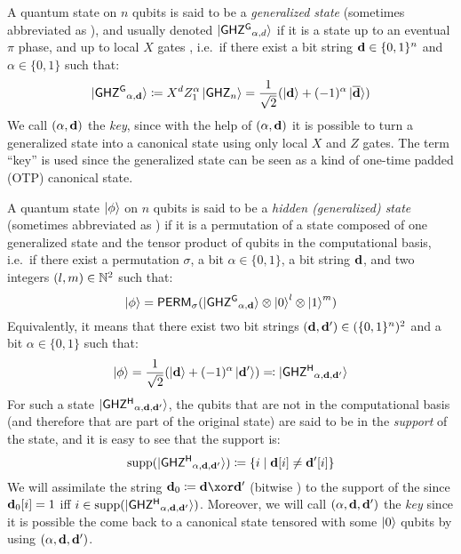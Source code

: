 {  \begin{definition}
    A quantum state on $n$ qubits is said to be a \emph{generalized \GHZ{} state} (sometimes abbreviated as \GGHZ{}), and usually denoted $\ket{ {\sf GHZ^G} {}_{\alpha,d}}$ if it is a \GHZ{} state up to an eventual $\pi$ phase, and up to local $X$ gates , i.e.\ if there exist a bit string $\mathbf{d} \in \{0,1\}^n$ and $\alpha \in \{0,1\}$ such that:
    \[\ket{ {\sf GHZ^G} {}_{\alpha,\mathbf{d}}} \coloneqq X^{d}Z_1^\alpha\ket{{\sf GHZ}{}_n} = \frac{1}{\sqrt{2}}(\ket{\mathbf{d}} + (-1)^\alpha \ket{\overline{\mathbf{d}}}) \]
    We call $(\alpha,\mathbf{d})$ the \emph{\GHZ{} key}, since with the help of $(\alpha,\mathbf{d})$ it is possible to turn a generalized \GHZ{} state into a canonical \GHZ{} state using only local $X$ and $Z$ gates. The term ``key'' is used since the generalized \GHZ{} state can be seen as a kind of one-time padded (OTP) canonical \GHZ{} state.
  \end{definition}

  \begin{definition}
    A quantum state $\ket{\phi}$ on $n$ qubits is said to be a \emph{hidden (generalized) \GHZ{} state} (sometimes abbreviated as \HGHZ{}) if it is a permutation of a state composed of one generalized \GHZ{} state and the tensor product of qubits in the computational basis, i.e.\ if there exist a permutation $\sigma$, a bit $\alpha \in \{0,1\}$, a bit string $\mathbf{d}$, and two integers $(l, m) \in \mathbb{N}^2$ such that:
    \[\ket{\phi} = {\sf PERM}_\sigma(\ket{ {\sf GHZ^G} {}_{\alpha,\mathbf{d}}} \otimes \ket{0}^{l} \otimes \ket{1}^{m}) \]
    Equivalently, it means that there exist two bit strings $(\mathbf{d}, \mathbf{d}') \in (\{0,1\}^n)^2$ and a bit $\alpha \in \{0,1\}$ such that:
    \[\ket{\phi} = \frac{1}{\sqrt{2}} (\ket{\mathbf{d}} + (-1)^\alpha \ket{\mathbf{d}'}) \eqqcolon \ket{ {\sf GHZ^H} {}_{\alpha,\mathbf{d},\mathbf{d}'}}\]
    For such a state $\ket{ {\sf GHZ^H} {}_{\alpha,\mathbf{d},\mathbf{d}'}}$, the qubits that are not in the computational basis (and therefore that are part of the original \GGHZ{} state) are said to be in the \emph{support} of the \HGHZ{} state, and it is easy to see that the support is:
    \[\operatorname{supp}(\ket{ {\sf GHZ^H} {}_{\alpha,\mathbf{d},\mathbf{d}'}}) \coloneqq \{i \mid \mathbf{d}[i] \neq \mathbf{d}'[i] \}\]
    We will assimilate the string $\vect{d}_0 \eqdef \vect{d} \xor \vect{d}'$ (bitwise \XOR{}) to the support of the \HGHZ{} since $\mathbf{d}_0[i] = 1$ iff $i \in \operatorname{supp}(\ket{ {\sf GHZ^H} {}_{\alpha,\mathbf{d},\mathbf{d}'}})$. Moreover, we will call $(\alpha,\mathbf{d},\mathbf{d}')$ the \emph{\GHZ{} key} since it is possible the come back to a canonical \GHZ{} state tensored with some $\ket{0}$ qubits by using $(\alpha,\mathbf{d},\mathbf{d}')$.
  \end{definition}
}
